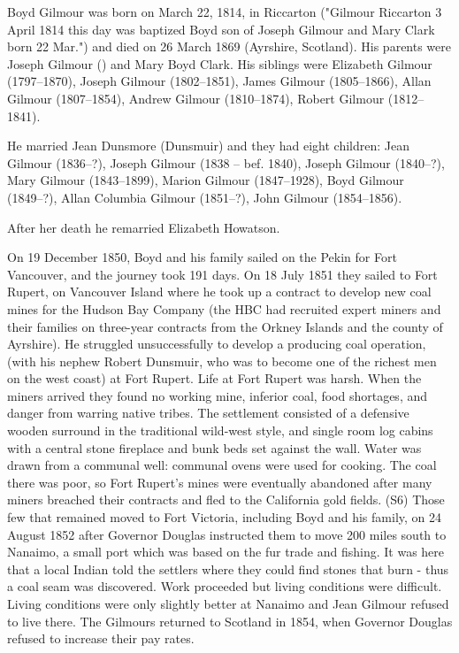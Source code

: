 
Boyd Gilmour was born on March 22, 1814, in Riccarton ("Gilmour Riccarton 3 April 1814 this day was baptized Boyd son of Joseph Gilmour and Mary Clark born 22 Mar.") and died on 26 March 1869 (Ayrshire, Scotland).  His parents were Joseph Gilmour () and Mary Boyd Clark. His siblings were Elizabeth Gilmour (1797--1870), Joseph Gilmour (1802--1851),
James Gilmour (1805--1866), Allan Gilmour (1807--1854), Andrew Gilmour (1810--1874), Robert Gilmour (1812--1841).


He married Jean Dunsmore (Dunsmuir) and they had eight children:  Jean Gilmour (1836--?), Joseph Gilmour (1838 -- bef. 1840), Joseph Gilmour (1840--?), Mary Gilmour (1843--1899),  Marion Gilmour (1847--1928), Boyd Gilmour (1849--?), Allan Columbia Gilmour (1851--?), John Gilmour (1854--1856).

After her death he remarried Elizabeth Howatson.

On 19 December 1850, Boyd and his family sailed on the Pekin for Fort Vancouver, and the journey took 191 days. On 18 July 1851 they sailed to Fort Rupert, on Vancouver Island where he took up a contract to develop new coal mines for the Hudson Bay Company (the HBC had recruited expert miners and their families on three-year contracts from the Orkney Islands and the county of Ayrshire). He struggled unsuccessfully to develop a producing coal operation, (with his nephew Robert Dunsmuir, who was to become one of the richest men on the west coast) at Fort Rupert. Life at Fort Rupert was harsh. When the miners arrived they found no working mine, inferior coal, food shortages, and danger from warring native tribes. The settlement consisted of a defensive wooden surround in the traditional wild-west style, and single room log cabins with a central stone fireplace and bunk beds set against the wall. Water was drawn from a communal well: communal ovens were used for cooking. The coal there was poor, so Fort Rupert’s mines were eventually abandoned after many miners breached their contracts and fled to the California gold fields. (S6) Those few that remained moved to Fort Victoria, including Boyd and his family, on 24 August 1852 after Governor Douglas instructed them to move 200 miles south to Nanaimo, a small port which was based on the fur trade and fishing. It was here that a local Indian told the settlers where they could find stones that burn - thus a coal seam was discovered. Work proceeded but living conditions were difficult. Living conditions were only slightly better at Nanaimo and Jean Gilmour refused to live there. The Gilmours returned to Scotland in 1854, when Governor Douglas refused to increase their pay rates.

